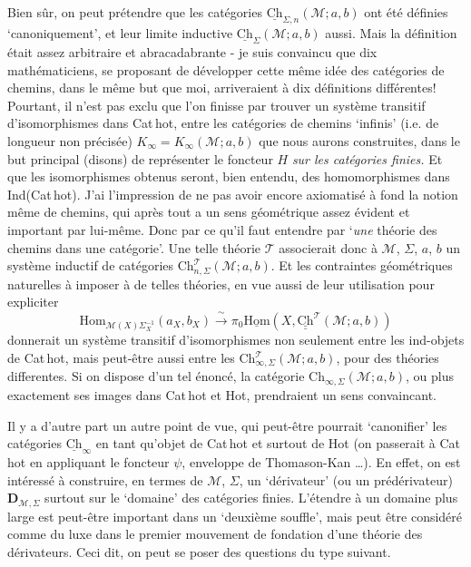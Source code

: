 \documentclass[11pt]{article}
\newcommand{\msp}[1]{\marginpar{\footnotesize [#1]}}
\newcommand{\uHom}{\underline{\mathrm{Hom}}}
\newcommand{\uCh}{\underline{\mathrm{Ch}}}
\newcommand{\Hom}{\mathrm{Hom}}
\newcommand{\Ch}{\mathrm{Ch}}
\newcommand{\Chh}{\underline{\underline{\mathrm{Ch}}}}
\begin{document}
Bien sûr, on peut prétendre que les catégories $\uCh_{\Sigma,n}(\mathcal{M}; a, b)$ ont été définies `canoniquement', et leur limite inductive $\uCh_{\Sigma}(\mathcal{M}; a, b)$ aussi. Mais la définition était assez arbitraire et abracadabrante - je suis convaincu que dix mathématiciens, se proposant de développer cette même idée des catégories de chemins, dans le même but que moi, arriveraient à dix définitions différentes! Pourtant, il n'est pas exclu que l'on finisse par trouver un système transitif d'isomorphismes dans Cat\,hot, entre les catégories de chemins `infinis' (i.e. de longueur non précisée) $K_\infty = K_\infty(\mathcal{M}; a, b)$ que nous aurons construites, dans le but
\msp{page 50}
principal (disons) de représenter le foncteur $H$ \textit{sur les catégories finies.} Et que les isomorphismes obtenus seront, bien entendu, des homomorphismes dans Ind(Cat\,hot). J'ai l'impression de ne pas avoir encore axiomatisé à fond la notion même de chemins, qui après tout a un sens géométrique assez évident et important par lui-même. Donc par ce qu'il faut entendre par `\textit{une} théorie des chemins dans une catégorie'. Une telle théorie $\mathcal{T}$ associerait donc à $\mathcal{M}$, $\Sigma$, $a$, $b$ un système inductif de catégories $\Ch^{\mathcal{T}}_{n,\Sigma}(\mathcal{M}; a, b)$. Et les contraintes géométriques naturelles à imposer à de telles théories, en vue aussi de leur utilisation pour expliciter
\[
\Hom_{\mathcal{M}(X)\Sigma_X^{-1}}(a_X, b_X) \xrightarrow{\ \sim\ } \pi_0\uHom(X, \Chh^{\mathcal{T}}(\mathcal{M}; a, b)) %
\]
donnerait un système transitif d'isomorphismes non seulement entre les ind-objets de Cat\,hot, mais peut-être aussi entre les $\Ch^{\mathcal{T}}_{\infty,\Sigma}(\mathcal{M}; a, b)$, pour des théories differentes. Si on dispose d'un tel énoncé, la catégorie $\Ch_{\infty,\Sigma}(\mathcal{M}; a, b)$, ou plus exactement ses images dans Cat\,hot et Hot, %
\msp{page 51}
prendraient un sens convaincant.

Il y a d'autre part un autre point de vue, qui peut-être pourrait `canonifier' les catégories $\uCh_\infty$ en tant qu'objet de Cat\,hot et surtout de Hot (on passerait à Cat\,hot en appliquant le foncteur $\psi$, enveloppe de Thomason-Kan \ldots). En effet, on est intéressé à construire, en termes de $\mathcal{M}$, $\Sigma$, un `dérivateur' (ou un prédérivateur) $\mathbf{D}_{\mathcal{M},\Sigma}$ surtout sur le `domaine' des catégories finies. L'étendre à un domaine plus large est peut-être important dans un `deuxième souffle', mais peut être considéré comme du luxe dans le premier mouvement de fondation d'une théorie des dérivateurs. Ceci dit, on peut se poser des questions du type suivant.
\end{document}
